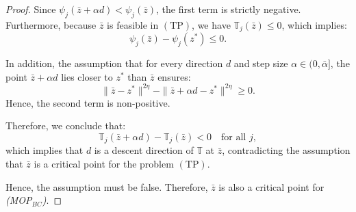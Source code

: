 \documentclass[10pt,a4paper]{amsart}
\newcommand{\obj}[1]{\psi_{#1}}               %
\newcommand{\tunobj}[1]{\mathbb{T}_{#1}}               %
\newcommand{\tun}{\boldsymbol{\mathbb{T}}}                 %
\newcommand{\xlm}{z^*}                    %
\begin{document}
\begin{proof}


Since $\obj{j}(\bar{z} + \alpha d) < \obj{j}(\bar{z})$, the first term is strictly negative.  
Furthermore, because $\bar{z}$ is feasible in $(\mathrm{TP})$, we have \(\tunobj{j}(\bar{z}) \leq 0\), which implies:
$$\obj{j}(\bar{z}) - \obj{j}(\xlm) \leq 0.$$

In addition, the assumption that for every direction $d$ and step size $\alpha \in (0, \bar{\alpha}]$, 
the point $\bar{z} + \alpha d$ lies closer to $\xlm$ than $\bar{z}$ ensures:
\[
\| \bar{z} - \xlm \|^{2\eta} - \| \bar{z} + \alpha d - \xlm \|^{2\eta} \geq 0.
\]
Hence, the second term is non-positive.

Therefore, we conclude that:
\[
\tunobj{j}(\bar{z} + \alpha d) - \tunobj{j}(\bar{z}) < 0 \quad \text{for all } j,
\]
which implies that \(d\) is a descent direction of $\tun$ at $\bar{z}$, contradicting the assumption that \(\bar{z}\) is a critical point for the problem $(\mathrm{TP})$.

Hence, the assumption must be false. Therefore, $\bar{z}$ is also a critical point for \emph{(MOP\(_{BC}\))}.
\end{proof}
\end{document}
